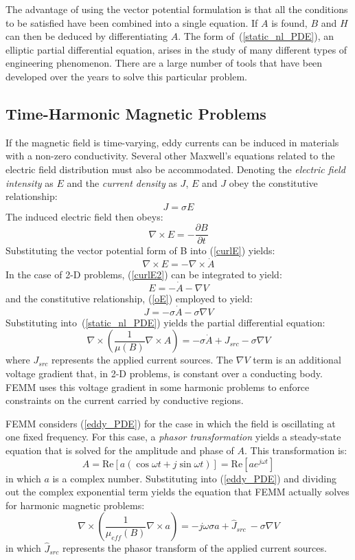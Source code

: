 \documentclass[12pt]{report}
\newcommand{\be}{\begin{equation}}
\newcommand{\ee}{\end{equation}}
\newcommand{\Curl}{\nabla \times}
\begin{document}
The advantage of using the vector potential formulation is that all
the conditions to be satisfied have been combined into a single
equation. If $A$ is found, $B$ and $H$ can then be deduced by
differentiating $A$. The form of~(\ref{static_nl_PDE}), an elliptic
partial differential equation, arises in the study of many
different types of engineering phenomenon. There are a large number
of tools that have been developed over the years to solve this
particular problem.

\subsection{Time-Harmonic Magnetic Problems}

If the magnetic field is time-varying, eddy currents can be induced
in materials with a non-zero conductivity. Several other Maxwell's
equations related to the electric field distribution must also be
accommodated. Denoting the {\em electric field intensity} as $E$
and the {\em current density} as $J$, $E$ and $J$ obey the
constitutive relationship:
\be \label{oE} J = \sigma E \ee
The induced electric field then obeys:
\be \label{curlE} \Curl E = -\frac{\partial B}{\partial t} \ee
Substituting the vector potential form of B into (\ref{curlE})
yields:
\be \label{curlE2} \Curl E = - \Curl \dot{A}\ee
In the case of 2-D problems, (\ref{curlE2}) can be integrated to
yield:
\be E = -\dot{A} - \nabla V \ee
and the constitutive relationship, (\ref{oE}) employed to yield:
\be J = - \sigma \dot{A} - \sigma \nabla V \ee
Substituting into~(\ref{static_nl_PDE}) yields the partial
differential equation:
\be \label{eddy_PDE} \nabla \times \left( \frac{1}{\mu(B)} \nabla \times A \right) =  - \sigma \dot{A} + J_{src} - \sigma \nabla V \ee
where $J_{src}$ represents the applied current sources.  The
$\nabla V$ term is an additional voltage gradient that, in 2-D
problems, is constant over a conducting body.  FEMM uses this
voltage gradient in some harmonic problems to enforce constraints
on the current carried by conductive regions.

FEMM considers (\ref{eddy_PDE}) for the case in which the field is
oscillating at one fixed frequency.  For this case, a {\em phasor
transformation} \cite{Hoole} yields a steady-state equation that is
solved for the amplitude and phase of $A$.  This transformation is:
\be \label{phasor_transformation} A= \mbox{Re}\left[a \left( \cos \omega t + j \sin \omega t \right) \right]
= \mbox{Re} \left[ a e^{j \omega t} \right] \ee
in which $a$ is a complex number.  Substituting into
(\ref{eddy_PDE}) and dividing out the complex exponential term
yields the equation that FEMM actually solves for harmonic magnetic
problems:
\be \label{harmonic_PDE} \nabla \times \left( \frac{1}{\mu_{eff}(B)} \nabla \times a \right) = - j \omega \sigma a + \hat{J}_{src} \ - \sigma \nabla V\ee
in which $\hat{J}_{src}$ represents the phasor transform of the
applied current sources.
\end{document}
